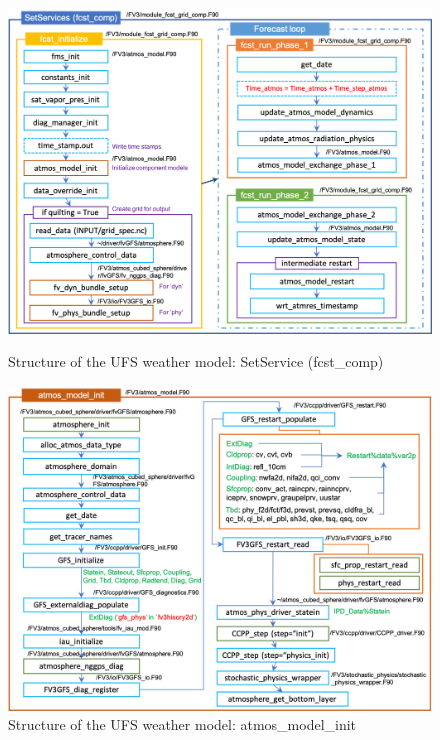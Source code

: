 \documentclass[11pt,fleqn]{report}              %
\begin{document}
\begin{figure}[ht!]
  \centering
  \includegraphics[width=0.73\linewidth]{fv3_struct_setservice.png}
  \caption{Structure of the UFS weather model: SetService (fcst\_comp)}
  \label{fig:fv_struct_setservice}

\vspace{0.1cm}

  \includegraphics[width=0.73\linewidth]{fv3_struct_atmosmodelinit.png}
  \caption{Structure of the UFS weather model: atmos\_model\_init}
  \label{fig:fv_struct_atmos_model_init}
\end{figure}
\end{document}
